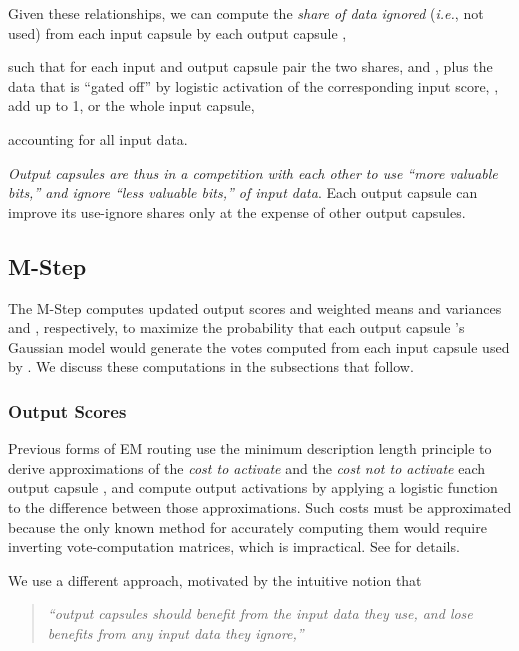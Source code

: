 \documentclass[11pt,a4paper]{article}
\begin{document}
Given these relationships, we can compute the \emph{share of data ignored} ({\em i.e.}, not used)  from each input capsule  by each output capsule ,



such that for each input and output capsule pair  the two shares,  and , plus the data that is ``gated off'' by logistic activation of the corresponding input score, , add up to 1, or the whole input capsule,



accounting for all input data.

{\em Output capsules are thus in a competition with each other to use ``more valuable bits,'' and ignore ``less valuable bits,'' of input data}. Each output capsule can improve its use-ignore shares only at the expense of other output capsules. 

\subsection{M-Step}\label{ssec:M_Step}

The M-Step computes updated output scores  and weighted means and variances  and , respectively, to maximize the probability that each output capsule 's Gaussian model would generate the votes computed from each input capsule  used by . We discuss these computations in the subsections that follow.

\subsubsection{Output Scores}

Previous forms of EM routing use the minimum description length principle to derive approximations of the \emph{cost to activate} and the \emph{cost not to activate} each output capsule , and compute output activations by applying a logistic function to the difference between those approximations. Such costs must be approximated because the only known method for accurately computing them would require inverting  vote-computation matrices, which is impractical. See \citet{46653} for details.

We use a different approach, motivated by the intuitive notion that

\begin{quote}
	\emph{``output capsules should benefit from the input data they use, and lose benefits from any input data they ignore,''}
\end{quote}
\end{document}
